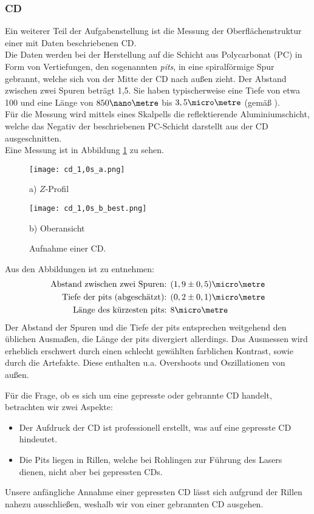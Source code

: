 \subsubsection{CD}
Ein weiterer Teil der Aufgabenstellung ist die Messung der Oberflächenstruktur einer mit Daten beschriebenen CD.\\
Die Daten werden bei der Herstellung auf die Schicht aus Polycarbonat (PC) in Form von Vertiefungen, den sogenannten \emph{pits}, in eine spiralförmige Spur gebrannt, welche sich von der Mitte der CD nach außen zieht. Der Abstand zwischen zwei Spuren beträgt 1,5\micro\metre. Sie haben typischerweise eine Tiefe von etwa 100\nano\metre{} und eine Länge von $850\nano\metre$ bis $3,5\micro\metre$ (gemäß \cite{lit:wiki_cd}).\\
Für die Messung wird mittels eines Skalpells die reflektierende Aluminiumschicht, welche das Negativ der beschriebenen PC-Schicht darstellt aus der CD ausgeschnitten.\\
Eine Messung ist in Abbildung \ref{fig:CD} zu sehen.
\begin{figure}[h]
\centering
	\begin{minipage}{0.45\textwidth}
	\centering
		\texttt{[image: cd\_1,0s\_a.png]}
		\caption*{a) $Z$-Profil}
	\end{minipage}
	\hfill
	\begin{minipage}{0.45\textwidth}
	\centering
		\texttt{[image: cd\_1,0s\_b\_best.png]}
		\caption*{b) Oberansicht}
	\end{minipage}
	\caption{Aufnahme einer CD.}
	\label{fig:CD}
\end{figure}

Aus den Abbildungen ist zu entnehmen:\\[-1em]
\begin{align*}
\text{Abstand zwischen zwei Spuren: }& (1,9\pm0,5)\micro\metre\\
\text{Tiefe der pits (abgeschätzt): }& (0,2\pm0,1)\micro\metre\\
\text{Länge des kürzesten pits: }& 8\micro\metre 
\end{align*}
Der Abstand der Spuren und die Tiefe der pits entsprechen weitgehend den üblichen Ausmaßen, die Länge der pits divergiert allerdings. Das Ausmessen wird erheblich erschwert durch einen schlecht gewählten farblichen Kontrast, sowie durch die Artefakte. Diese enthalten u.a. Overshoots und Oszillationen von außen.

Für die Frage, ob es sich um eine gepresste oder gebrannte CD handelt, betrachten wir zwei Aspekte:
\begin{itemize}
\item Der Aufdruck der CD ist professionell erstellt, was auf eine gepresste CD hindeutet.
\item Die Pits liegen in Rillen, welche bei Rohlingen zur Führung des Lasers dienen, nicht aber bei gepressten CDs.
\end{itemize}
Unsere anfängliche Annahme einer gepressten CD lässt sich aufgrund der Rillen nahezu ausschließen, weshalb wir von einer gebrannten CD ausgehen.

